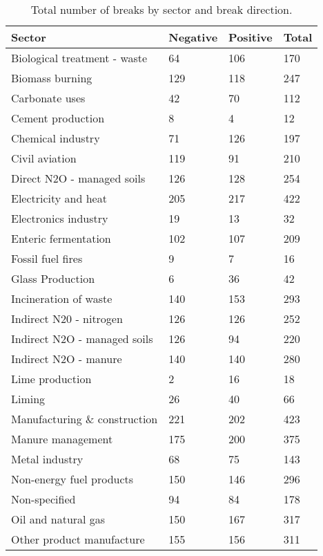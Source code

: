\documentclass[a4paper]{article}
\begin{document}
\begin{table}[!ht]
    \centering
    \caption{Total number of breaks by sector and break direction.}
    \renewcommand{\arraystretch}{1.2}
    \begin{tabular}{llll}
    \hline
        \textbf{Sector} & \textbf{Negative} & \textbf{Positive} & \textbf{Total} \\ \hline
        Biological treatment - waste & 64 & 106 & 170 \\ 
        Biomass burning & 129 & 118 & 247 \\ 
        Carbonate uses & 42 & 70 & 112 \\ 
        Cement production & 8 & 4 & 12 \\ 
        Chemical industry & 71 & 126 & 197 \\ 
        Civil aviation & 119 & 91 & 210 \\ 
        Direct N2O - managed soils & 126 & 128 & 254 \\ 
        Electricity and heat & 205 & 217 & 422 \\ 
        Electronics industry & 19 & 13 & 32 \\ 
        Enteric fermentation & 102 & 107 & 209 \\ 
        Fossil fuel fires & 9 & 7 & 16 \\ 
        Glass Production & 6 & 36 & 42 \\ 
        Incineration of waste & 140 & 153 & 293 \\ 
        Indirect N20 - nitrogen & 126 & 126 & 252 \\ 
        Indirect N2O  - managed soils & 126 & 94 & 220 \\ 
        Indirect N2O - manure & 140 & 140 & 280 \\ 
        Lime production & 2 & 16 & 18 \\ 
        Liming & 26 & 40 & 66 \\ 
        Manufacturing \& construction & 221 & 202 & 423 \\ 
        Manure management & 175 & 200 & 375 \\ 
        Metal industry & 68 & 75 & 143 \\ 
        Non-energy fuel products & 150 & 146 & 296 \\ 
        Non-specified & 94 & 84 & 178 \\ 
        Oil and natural gas & 150 & 167 & 317 \\ 
        Other product manufacture & 155 & 156 & 311 \\ 

\end{tabular}
\end{table}
\end{document}
